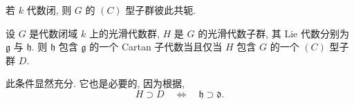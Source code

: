 \begin{corollary}
若 \(k\) 代数闭, 则 \(G\) 的 \((C)\) 型子群彼此共轭.
\end{corollary}

\begin{corollary}
设 \(G\) 是代数闭域 \(k\) 上的光滑代数群, \(H\) 是 \(G\) 的光滑代数子群, 其 Lie 代数分别为 \(\mathfrak g\) 与 \(\mathfrak h\). 则 \(\mathfrak h\) 包含 \(\mathfrak g\) 的一个 Cartan 子代数当且仅当 \(H\) 包含 \(G\) 的一个 \((C)\) 型子群 \(D\).
\end{corollary}

此条件显然充分. 它也是必要的, 因为根据,
\[
  H\supset D
  \quad\Longleftrightarrow\quad
  \mathfrak h\supset\mathfrak d.
\]

